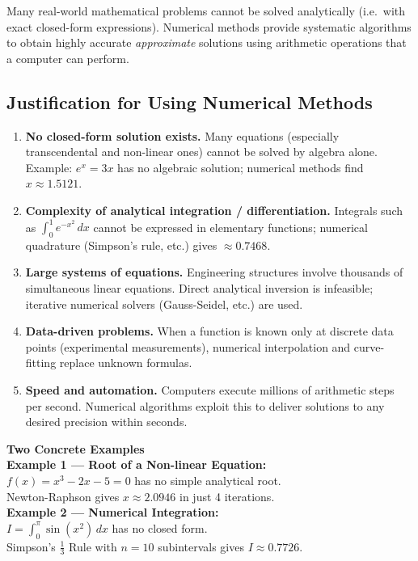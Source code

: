 \documentclass[12pt]{article}
\begin{document}
\begin{conceptbox}
Many real-world mathematical problems cannot be solved analytically (i.e.\ with exact closed-form expressions). Numerical methods provide systematic algorithms to obtain highly accurate \emph{approximate} solutions using arithmetic operations that a computer can perform.
\end{conceptbox}

\vspace{6pt}
\subsection*{Justification for Using Numerical Methods}

\begin{enumerate}[noitemsep, topsep=6pt]
  \item \textbf{No closed-form solution exists.}
        Many equations (especially transcendental and non-linear ones) cannot be solved by algebra alone.
        Example: $e^x = 3x$ has no algebraic solution; numerical methods find $x \approx 1.5121$.

  \item \textbf{Complexity of analytical integration / differentiation.}
        Integrals such as $\displaystyle\int_0^1 e^{-x^2}\,dx$ cannot be expressed in elementary functions;
        numerical quadrature (Simpson's rule, etc.) gives $\approx 0.7468$.

  \item \textbf{Large systems of equations.}
        Engineering structures involve thousands of simultaneous linear equations.
        Direct analytical inversion is infeasible; iterative numerical solvers (Gauss-Seidel, etc.) are used.

  \item \textbf{Data-driven problems.}
        When a function is known only at discrete data points (experimental measurements), numerical
        interpolation and curve-fitting replace unknown formulas.

  \item \textbf{Speed and automation.}
        Computers execute millions of arithmetic steps per second. Numerical algorithms exploit this to
        deliver solutions to any desired precision within seconds.
\end{enumerate}

\vspace{8pt}

\begin{formulabox}
\textbf{Two Concrete Examples}\\[6pt]
\textbf{Example 1 --- Root of a Non-linear Equation:}\\
$f(x)=x^3-2x-5=0$ has no simple analytical root.\\
Newton-Raphson gives $x \approx \mathbf{2.0946}$ in just 4 iterations.\\[8pt]
\textbf{Example 2 --- Numerical Integration:}\\
$\displaystyle I = \int_0^{\pi} \sin(x^2)\,dx$ has no closed form.\\
Simpson's $\tfrac{1}{3}$ Rule with $n=10$ subintervals gives $I \approx \mathbf{0.7726}$.
\end{formulabox}
\end{document}
